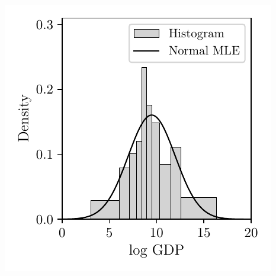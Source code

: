 \documentclass{article}
\begin{document}
\includegraphics[scale=0.5]{graphics/trade_gdp_2005.pdf}
\end{document}
